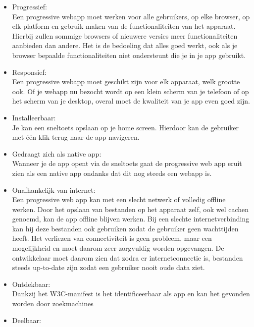 \begin{itemize}  
	\item Progressief: \\
	Een progressive webapp moet werken voor alle gebruikers, op elke browser, op elk platform en gebruik maken van de functionaliteiten van het apparaat. Hierbij zullen sommige browsers of nieuwere versies meer functionaliteiten aanbieden dan andere. Het is de bedoeling dat alles goed werkt, ook als je browser bepaalde functionaliteiten niet ondersteunt die je in je app gebruikt. \\ 
	\item Responsief: \\
	Een progressive webapp moet geschikt zijn voor elk apparaat, welk grootte ook. Of je webapp nu bezocht wordt op een klein scherm van je telefoon of op het scherm van je desktop, overal moet de kwaliteit van je app even goed zijn. 
	\\
	\item Installeerbaar: \\
	Je kan een sneltoets opslaan op je home screen. Hierdoor kan de gebruiker met één klik terug naar de app navigeren.
	\\
	\item Gedraagt zich als native app: \\
	Wanneer je de app opent via de sneltoets gaat de progressive web app eruit zien als een native app ondanks dat dit nog steeds een webapp is.
	\\
	\item Onafhankelijk van internet: \\
	Een progressive web app kan met een slecht netwerk of volledig offline werken. Door het opslaan van bestanden op het apparaat zelf, ook wel cachen genoemd, kan de app offline blijven werken. Bij een slechte internetverbinding kan hij deze bestanden ook gebruiken zodat de gebruiker geen wachttijden heeft. Het verliezen van connectiviteit is geen probleem, maar een mogelijkheid en moet daarom zeer zorgvuldig worden opgevangen. De ontwikkelaar moet daarom zien dat zodra er internetconnectie is, bestanden steeds up-to-date zijn zodat een gebruiker nooit oude data ziet.
	\\
		\item Ontdekbaar: \\
	Dankzij het W3C-manifest is het identificeerbaar als app en kan het gevonden worden door zoekmachines
	\\
		\item Deelbaar: \\

\end{itemize}
